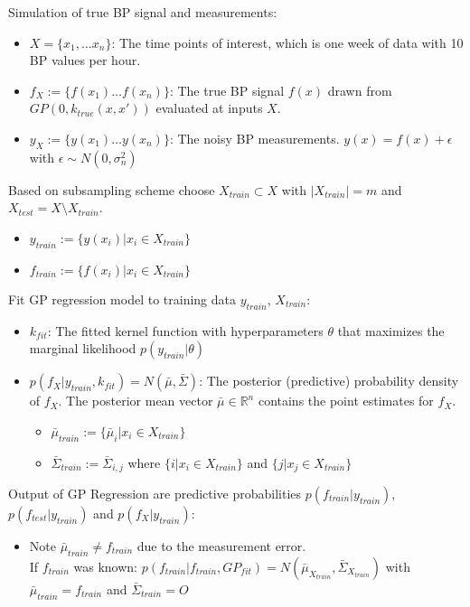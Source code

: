 Simulation of true BP signal and measurements:
    \begin{itemize}
        \item $X=\{x_1, \dots x_n\}$: The time points of interest, which is one week of data with 10 BP values per hour.
        \item $f_X := \{f(x_1) \dots f(x_n)\}$: The true BP signal $f(x)$ drawn from $GP(0, k_{true}(x,x'))$ evaluated at inputs $X$.
        \item $y_X := \{y(x_1) \dots y(x_n)\}$: The noisy BP measurements. $y(x)= f(x) + \epsilon$ with $\epsilon \sim N(0, \sigma_n^2)$
    \end{itemize}

Based on subsampling scheme choose $X_{train} \subset X$ with $|X_{train}| = m$ and $X_{test} = X \setminus X_{train}$.
\begin{itemize}
    \item $y_{train} := \{y(x_i) | x_i \in X_{train}\}$
    \item  $f_{train} := \{f(x_i) | x_i \in X_{train}\}$
\end{itemize}


	Fit GP regression model to training data $y_{train}$, $X_{train}$:
    \begin{itemize}
        \item $k_{fit}$: The fitted kernel function with hyperparameters $\theta$ that maximizes the marginal likelihood
        $p(y_{train}| \theta)$
        \item $p(f_X| y_{train}, k_{fit}) = N(\bar{\mu}, \bar{\Sigma})$:
        The posterior (predictive) probability density of $f_X$. The posterior mean vector
        $\bar{\mu} \in \mathbb{R}^n$ contains the point estimates for $f_X$.
        \begin{itemize}
            \item $\bar{\mu}_{train} := \{\bar{\mu}_i | x_i \in X_{train}\}$
            \item $\bar{\Sigma}_{train} := \bar{\Sigma}_{i,j}$ where $\{i | x_i \in X_{train}\}$ and $\{j | x_j \in X_{train}\}$

        \end{itemize}
    \end{itemize}

	Output of GP Regression are predictive probabilities $p(f_{train}| y_{train})$,
		$p(f_{test}| y_{train})$ and $p(f_{X}| y_{train})$:
			\begin{itemize}
				\item Note $\bar{\mu}_{train} \neq f_{train}$ due to the measurement error. \\ If
				$f_{train}$ was known: $p(f_{train}| f_{train}, GP_{fit}) = N(\bar{\mu}_{X_{train}},
				\bar{\Sigma}_{X_{train}})$
				with $\bar{\mu}_{train} = f_{train}$ and $\bar{\Sigma}_{train} = {\displaystyle O}$
			\end{itemize}



